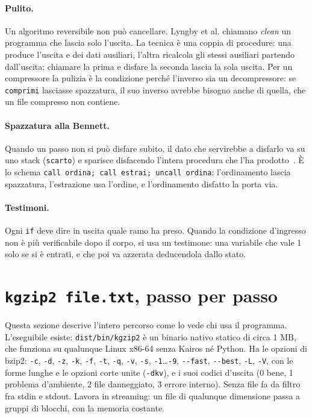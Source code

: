 \documentclass[11pt,a4paper]{article}
\newcommand{\kw}[1]{\texttt{#1}}
\begin{document}
\paragraph{Pulito.} Un algoritmo reversibile non può cancellare. Lyngby et al. chiamano \emph{clean} un programma che lascia solo l'uscita. La tecnica è una coppia di procedure: una produce l'uscita e dei dati ausiliari, l'altra ricalcola gli stessi ausiliari partendo dall'uscita; chiamare la prima e disfare la seconda lascia la sola uscita. Per un compressore la pulizia è la condizione perché l'inverso sia un decompressore: se \kw{comprimi} lasciasse spazzatura, il suo inverso avrebbe bisogno anche di quella, che un file compresso non contiene.

\paragraph{Spazzatura alla Bennett.} Quando un passo non si può disfare subito, il dato che servirebbe a disfarlo va su uno stack (\kw{scarto}) e sparisce disfacendo l'intera procedura che l'ha prodotto~\cite{bennett}. È lo schema \kw{call ordina; call estrai; uncall ordina}: l'ordinamento lascia spazzatura, l'estrazione usa l'ordine, e l'ordinamento disfatto la porta via.

\paragraph{Testimoni.} Ogni \kw{if} deve dire in uscita quale ramo ha preso. Quando la condizione d'ingresso non è più verificabile dopo il corpo, si usa un testimone: una variabile che vale 1 solo se si è entrati, e che poi va azzerata deducendola dallo stato.

\section{\texttt{kgzip2 file.txt}, passo per passo}
\label{sec:pipeline}

Questa sezione descrive l'intero percorso come lo vede chi usa il programma. L'eseguibile esiste: \kw{dist/bin/kgzip2} è un binario nativo statico di circa 1 MB, che funziona su qualunque Linux x86-64 senza Kairos né Python. Ha le opzioni di bzip2: \kw{-c}, \kw{-d}, \kw{-z}, \kw{-k}, \kw{-f}, \kw{-t}, \kw{-q}, \kw{-v}, \kw{-s}, \kw{-1}\dots\kw{-9}, \kw{-{}-fast}, \kw{-{}-best}, \kw{-L}, \kw{-V}, con le forme lunghe e le opzioni corte unite (\kw{-dkv}), e i suoi codici d'uscita (0 bene, 1 problema d'ambiente, 2 file danneggiato, 3 errore interno). Senza file fa da filtro fra stdin e stdout. Lavora in streaming: un file di qualunque dimensione passa a gruppi di blocchi, con la memoria costante.
\end{document}

